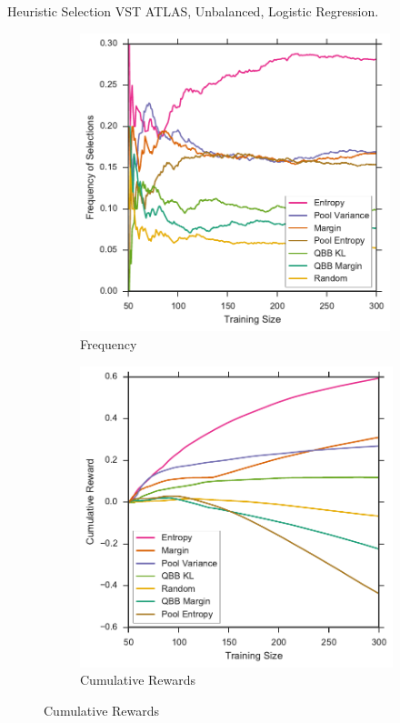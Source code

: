 \documentclass{beamer}
\begin{document}
\begin{frame}{Heuristic Selection}
	VST ATLAS, Unbalanced, Logistic Regression.
		\begin{figure}[tbp]
			\centering
			\begin{subfigure}{.5\textwidth}
				\centering
				\includegraphics[width=0.99\textwidth]{../thesis/figures/5_thompson/vstatlas_ul_frequencies}
				\caption{Frequency}
			\end{subfigure}%
			\begin{subfigure}{.5\textwidth}
				\centering
				\includegraphics[width=0.99\linewidth]{../thesis/figures/5_thompson/vstatlas_ul_sum_rewards}
				\caption{Cumulative Rewards}
			\end{subfigure}
		\end{figure}
\end{frame}
\end{document}
